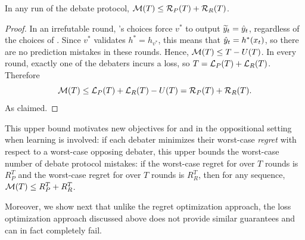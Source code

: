 \documentclass[11pt,letterpaper]{article}
\theoremstyle{definition}
\theoremstyle{plain}
\begin{document}







\begin{claim}\label{claim:regret}
In any run of the debate protocol,  ${\mathcal M}(T) \leq {{\mathcal R}_P}(T) + {{\mathcal R}_R}(T)$.
\end{claim}
\begin{proof}
In an irrefutable round,  \dt's choices force $v^*$ to output ${\widetilde{y}}_t = {\hat{y}}_t$, regardless of the choices of \df. Since $v^*$ validates $h^* = h_{v^*}$, this means that ${\hat{y}}_t=h^*(x_t)$, so there are no prediction mistakes in these rounds. Hence, ${\mathcal M}(T) \leq T-U(T)$. In every round, exactly one of the debaters incurs a loss, so
$T =  {{\mathcal L}_P}(T)+{{\mathcal L}_R}(T)$. Therefore
\[
{\mathcal M}(T) \leq {{\mathcal L}_P}(T)+{{\mathcal L}_R}(T)-U(T) = {{\mathcal R}_P}(T) + {{\mathcal R}_R}(T).
\]
As claimed.
\end{proof}

This upper bound motivates new objectives for \dt and \df in the oppositional setting when learning is involved: if each debater minimizes their worst-case \emph{regret} with respect to a worst-case opposing debater, this upper bounds the worst-case number of debate protocol mistakes: if the worst-case regret for \dt over $T$ rounds is $R_P^T$ and the worst-case regret for \df  over $T$ rounds is $R_R^T$, then for any sequence, ${\mathcal M}(T) \leq R_P^T+ R_R^T$.






Moreover, we show next that unlike the regret optimization approach, the loss optimization approach discussed above does not provide similar guarantees and can in fact completely fail. 
\end{document}
